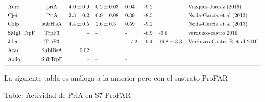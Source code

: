 \documentclass[12pt,twoside]{reedthesis}
\begin{document}
\[{\begin{tabular}{ l c r l l l l l}
  Auro        &priA   &$  4.0 \pm 0.9 $&$0.2 \pm 0.03   $&0.04                    &-9.2       &          &Vazquez-Juarez (2016)\\ [1ex]
  Cjei        &PriA   &$  2.3 \pm 0.2 $&$0.9 \pm 0.08   $&0.39                    &-8.5       &          &Noda-García et al (2013)\\ [1ex]
  Cdip        &subHisA&$  4.4 \pm 0.5 $&$2.6 \pm 0.3      $&0.59                  &-9.2       &          &Noda-García et al (2013)\\ [1ex]
  SMg1 TrpF   &TrpF3  &   -                &-                &-                       &-6.9     &-9.6      &verduzco-castro 2016\\ [1ex]
  Jden        &TrpF3  &   -                &-                &-          -7.2         &-9.4     &$16.8\pm3.3$&    Verduzco-Castro E et al  2016\\ [1ex]
  Acar      &SubHisA& 0.02                     &                 &                        &       &          &            \\ [1ex]
  Aodo        &SubTrpF&       -              &-                  &-                     &       &          &\\ [1ex]
  \hline
  \end{tabular}}
  \label{tab:PriAPRA}  
  \]
  
  \clearpage   La siguiente tabla es análoga a la anterior pero con el
  sustrato ProFAR
  
  Table: Actividad de PriA en S7 ProFAR \label{tab:PriAProFAR}
  
\end{document}
